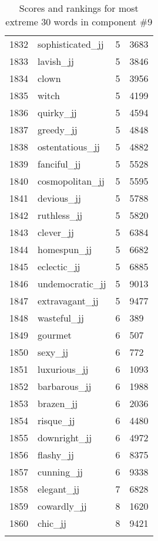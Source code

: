 \begin{longtable}[!htbp]{| rlr@{.}l |}
    1832 & sophisticated\_jj & 5 & 3683 \\
    1833 & lavish\_jj & 5 & 3846 \\
    1834 & clown & 5 & 3956 \\
    1835 & witch & 5 & 4199 \\
    1836 & quirky\_jj & 5 & 4594 \\
    1837 & greedy\_jj & 5 & 4848 \\
    1838 & ostentatious\_jj & 5 & 4882 \\
    1839 & fanciful\_jj & 5 & 5528 \\
    1840 & cosmopolitan\_jj & 5 & 5595 \\
    1841 & devious\_jj & 5 & 5788 \\
    1842 & ruthless\_jj & 5 & 5820 \\
    1843 & clever\_jj & 5 & 6384 \\
    1844 & homespun\_jj & 5 & 6682 \\
    1845 & eclectic\_jj & 5 & 6885 \\
    1846 & undemocratic\_jj & 5 & 9013 \\
    1847 & extravagant\_jj & 5 & 9477 \\
    1848 & wasteful\_jj & 6 & 389 \\
    1849 & gourmet & 6 & 507 \\
    1850 & sexy\_jj & 6 & 772 \\
    1851 & luxurious\_jj & 6 & 1093 \\
    1852 & barbarous\_jj & 6 & 1988 \\
    1853 & brazen\_jj & 6 & 2036 \\
    1854 & risque\_jj & 6 & 4480 \\
    1855 & downright\_jj & 6 & 4972 \\
    1856 & flashy\_jj & 6 & 8375 \\
    1857 & cunning\_jj & 6 & 9338 \\
    1858 & elegant\_jj & 7 & 6828 \\
    1859 & cowardly\_jj & 8 & 1620 \\
    1860 & chic\_jj & 8 & 9421 \\
    \hline
    \caption{Scores and rankings for most extreme 30 words in component \#9} \\
\end{longtable}
